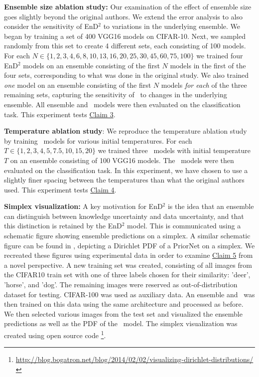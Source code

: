 \textbf{Ensemble size ablation study:} Our examination of the effect of ensemble size goes slightly beyond the original authors. We extend the error analysis to also consider the sensitivity of EnD$^2$ to variations in the underlying ensemble. We began by training a set of 400 VGG16 models on CIFAR-10. Next, we sampled randomly from this set to create 4 different sets, each consisting of 100 models. \\ For each $N \in \{1, 2, 3, 4, 6, 8, 10, 13, 16, 20, 25, 30, 45, 60, 75, 100\}$ we trained four EnD$^2$ models on an ensemble consisting of the first $N$ models in the first of the four sets, corresponding to what was done in the original study. We also trained \textit{one} model on an ensemble consisting of the first $N$ models \textit{for each} of the three remaining sets, capturing the sensitivity of \EnDD \ to changes in the underlying ensemble. All ensemble and \EnDD \ models were then evaluated on the classification task. This experiment tests \hyperlink{claim3}{Claim 3}. 

\textbf{Temperature ablation study}: We reproduce the temperature ablation study by training \EnDD \ models for various initial temperatures. For each $T \in \{1, 2, 3, 4, 5, 7.5, 10, 15, 20\}$ we trained three \EnDD \ models with initial temperature $T$ on an ensemble consisting of 100 VGG16 models. The \EnDD \ models were then evaluated on the classification task. In this experiment, we have chosen to use a slightly finer spacing between the temperatures than what the original authors used. This experiment tests \hyperlink{claim4}{Claim 4}.

\textbf{Simplex visualization:} A key motivation for EnD$^2$ is the idea that an ensemble can distinguish between knowledge uncertainty and data uncertainty, and that this distinction is retained by the EnD$^2$ model. This is communicated using a schematic figure showing ensemble predictions on a simplex. A similar schematic figure can be found in \cite{NIPS2018_7936}, depicting a Dirichlet PDF of a PriorNet on a simplex. We recreated these figures using experimental data in order to examine \hyperlink{claim5}{Claim 5} from a novel perspective. A new training set was created, consisting of all images from the CIFAR10 train set with one of three labels chosen for their similarity: 'deer', 'horse', and 'dog'. The remaining images were reserved as out-of-distribution dataset for testing. CIFAR-100 was used as auxiliary data. An ensemble and \EnDD \ was then trained on this data using the same architecture and processed as before. We then selected various images from the test set and visualized the ensemble predictions as well as the PDF of the \EnDD \ model. The simplex visualization was created using open source code \footnote{\url{http://blog.bogatron.net/blog/2014/02/02/visualizing-dirichlet-distributions/}}.

